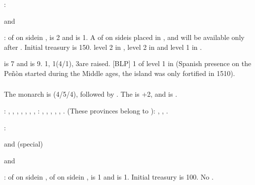 :
\begin{modlist}
\item[\SUB] \paysgenes
\item[\RM] \payspapaute and \paysnaples
\end{modlist}

:
\bparag \MNU of  on side\facemoins in \provinceToledo, \FTI is 2
and \DTI is 1. A \MNU of  on side\faceplus is placed in
\provinceVlaanderen, and will be available only after .
\bparag Initial treasury is 150\ducats.
\bparag \TradeFLEET level 2 in , level 2 in  and level
1 in .

\aparag {} is 7 and  is
9. 1\ARMY\faceplus, 1\FLEET\facemoins (4\NGD/1\NTD), 3\ND are raised. [BLP] 1
\Presidio of level 1 in  (Spanish presence on the Peñòn
started during the Middle ages, the island was only fortified in 1510).


\subsubsection{\paysmajeurPologne}
\aparag The monarch is  (4/5/4), followed by
. The \STAB is +2, and \POL is .

: \provinceWielkopolska, , \provinceDanzig, \provinceLublin, \provinceMalopolska,
\provinceWolyn, \provincePrypec,
: \provinceLietuva, \provinceSmolenska,
\provinceBaltarusija, \provinceSeveria, \provinceZemaitija, \provincePolacak.
 (These provinces belong to \paysUkraine):
\provinceUkrainya, \provincePodolie, \provincePoltava.

:
\begin{modlist}
\item[\VASSAL] \paysMazovie and \paysUkraine (special)
\item[\RM] \paysHongrie and \paysBoheme
\end{modlist}

:
\bparag \MNU of  on side\facemoins in \provinceLietuva, \MNU of
 on side\facemoins in \provinceWielkopolska, \FTI is 1 and \DTI is
1.
\bparag Initial treasury is 100\ducats.
\bparag No \TradeFLEET.

